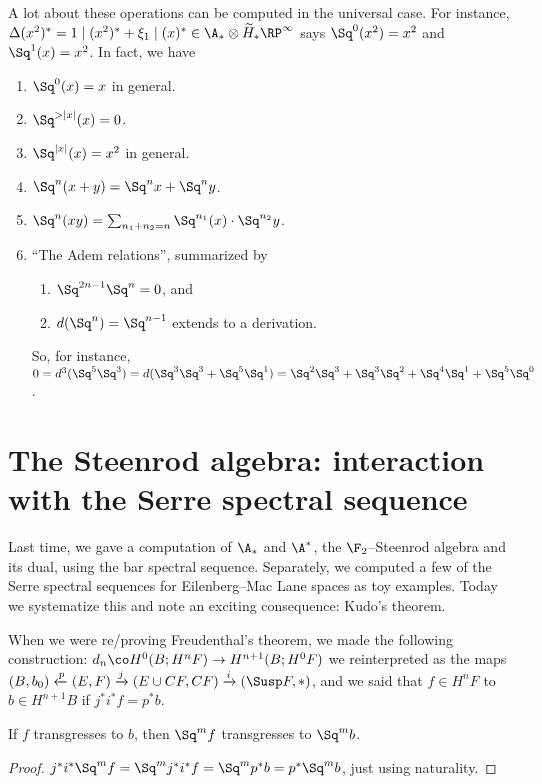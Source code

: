 A lot about these operations can be computed in the universal case.  For instance, $\Delta(x^2)^* = 1 \mid (x^2)^* + \xi_1 \mid (x)^* \in \A_* \otimes \widetilde H_* \RP^\infty$ says $\Sq^0(x^2) = x^2$ and $\Sq^1(x) = x^2$.  In fact, we have
\begin{enumerate}
    \item $\Sq^0(x) = x$ in general.
    \item $\Sq^{>|x|}(x) = 0$.
    \item $\Sq^{|x|}(x) = x^2$ in general.
    \item $\Sq^n(x+y) = \Sq^n x + \Sq^n y$.
    \item $\Sq^n(xy) = \sum_{n_1 + n_2 = n} \Sq^{n_1}(x) \cdot \Sq^{n_2} y$.
    \item ``The Adem relations'', summarized by
    \begin{enumerate}
        \item $\Sq^{2n-1} \Sq^n = 0$, and
        \item $d(\Sq^n) = \Sq^{n-1}$ extends to a derivation.
    \end{enumerate}
    So, for instance, $0 = d^3(\Sq^5 \Sq^3) = d(\Sq^3\Sq^3 + \Sq^5 \Sq^1) = \Sq^2 \Sq^3 + \Sq^3 \Sq^2 + \Sq^4 \Sq^1 + \Sq^5 \Sq^0$.
\end{enumerate}





\section{The Steenrod algebra: interaction with the Serre spectral sequence}

Last time, we gave a computation of $\A_*$ and $\A^*$, the $\F_2$--Steenrod algebra and its dual, using the bar spectral sequence.  Separately, we computed a few of the Serre spectral sequences for Eilenberg--Mac Lane spaces as toy examples.  Today we systematize this and note an exciting consequence: Kudo's theorem.

When we were re/proving Freudenthal's theorem, we made the following construction: $d_n\co H^0(B; H^n F) \to H^{n+1}(B; H^0 F)$ we reinterpreted as the maps $(B, b_0) \xleftarrow p (E, F) \xrightarrow j (E \cup CF, CF) \xrightarrow i (\Susp F, *)$, and we said that $f \in H^n F$  to $b \in H^{n+1} B$ if $j^* i^* f = p^* b$.

\begin{lemma}
If $f$ transgresses to $b$, then $\Sq^m f$ transgresses to $\Sq^m b$.
\end{lemma}
\begin{proof}
$j^* i^* \Sq^m f = \Sq^m j^* i^* f = \Sq^m p^* b = p^* \Sq^m b$, just using naturality.
\end{proof}


